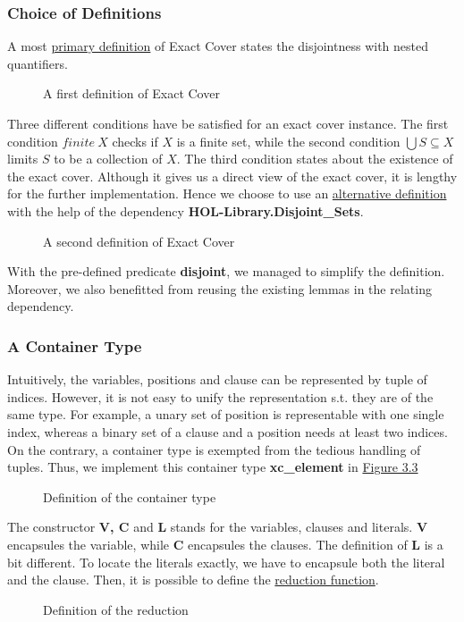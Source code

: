 \subsubsection{Choice of Definitions}
A most \hyperref[figure:3]{primary definition} of Exact Cover states the disjointness with nested quantifiers. 
\begin{figure}[!h]
    \caption{A first definition of Exact Cover}
    \label{figure:3}
\end{figure}
Three different conditions have be satisfied for an exact cover instance.
The first condition $finite\ X$ checks if $X$ is a finite set, while the second 
condition $\bigcup S \subseteq X$ limits $S$ to be a collection of $X$. The third 
condition states about the existence of the exact cover. Although it gives us a direct 
view of the exact cover, it is lengthy for the further implementation. Hence we choose to use 
an \hyperref[figure:4]{alternative definition} with the help of the dependency \textbf{HOL-Library.Disjoint\_Sets}.
\begin{figure}[!h]
    \caption{A second definition of Exact Cover}
    \label{figure:4}
\end{figure}
With the pre-defined predicate \textbf{disjoint}, we managed to simplify the definition. Moreover, 
we also benefitted from reusing the existing lemmas in the relating dependency.

\subsubsection{A Container Type}
Intuitively, the variables, positions and clause can be represented by tuple of indices. However, it is not easy 
to unify the representation s.t. they are of the same type. For example, a unary set of position is representable with
one single index, whereas a binary set of a clause and a position needs at least two indices. 
On the contrary, a container type is exempted from the tedious handling of tuples. 
Thus, we implement this container type \textbf{xc\_element} in \hyperref[figure:5]{Figure 3.3}
\begin{figure}[h!]
    \caption{Definition of the container type}
    \label{figure:5}
\end{figure}
The constructor \textbf{V, C} and \textbf{L} stands for the variables, clauses and literals. \textbf{V} 
encapsules the variable, while \textbf{C} encapsules the clauses. The definition of \textbf{L} is a bit different.
To locate the literals exactly, we have to encapsule both the literal and the clause. 
Then, it is possible to define the \hyperref[figure:6]{reduction function}. 
\begin{figure}[h!]
    \caption{Definition of the reduction}
    \label{figure:6}
\end{figure}
